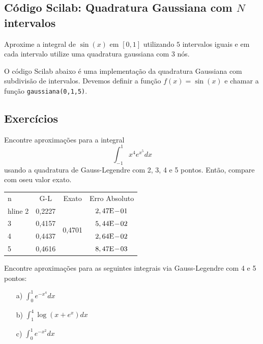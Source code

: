 \ifisscilab
\subsection{Código Scilab: Quadratura Gaussiana com $N$ intervalos}
\begin{ex}
Aproxime a integral de $\sin(x)$ em $[0,1]$ utilizando $5$ intervalos iguais e em cada intervalo utilize uma quadratura gaussiana com $3$ nós. 
\end{ex}

O código Scilab abaixo é uma implementação da quadratura Gaussiana com subdivisão de intervalos. Devemos definir a função $f(x)=\sin(x)$ e chamar a função \verb#gaussiana(0,1,5)#.


\fi

\subsection*{Exercícios}

\begin{exer}Encontre aproximações para a integral 
$$\int_{-1}^1 x^4e^{x^5}dx$$
usando a quadratura de Gauss-Legendre com 2, 3, 4 e 5 pontos. Então, compare com oseu valor exato.
\end{exer}
\begin{resp}
  \begin{center}
    \begin{tabular}{l|ccc}
      n& G-L& Exato& Erro Absoluto\\hline
      2& 0,2227 & \multirow{4}{*}{0,4701} & $2,47\mathrm{E}\!-\!01$\\
      3& 0,4157 & & $5,44\mathrm{E}\!-\!02$\\
      4& 0,4437 & & $2,64\mathrm{E}\!-\!02$\\
      5& 0,4616 & & $8,47\mathrm{E}\!-\!03$
    \end{tabular}
  \end{center}
\end{resp}

\begin{exer} Encontre aproximações para as seguintes integrais via Gauss-Legendre com 4 e 5 pontos:
\begin{itemize}
\item[a)] $\int_0^1 e^{-x^4}dx$
\item[b)] $\int_1^4 \log(x+e^x)dx$
\item[c)] $\int_0^1 e^{-x^2}dx$
\end{itemize}
\end{exer}

